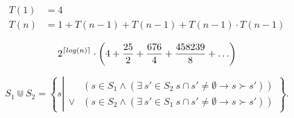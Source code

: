 \begin{frame}

\begin{align*}
T(1)&=4\\
T(n)&=1+T(n-1)+T(n-1)+T(n-1)\cdot T(n-1)
\end{align*}

$$2^{\lceil log(n)\rceil}\cdot\left(4+{25\over 2}+{676\over4}+{458239\over 8}+\ldots\right)$$

\end{frame}

\begin{frame}

$$S_1\Cup S_2 = \left\{ s \left|
\begin{array}{ll} &\left(s\in S_1 \wedge \left(\exists\ s'\in S_2\ s\cap
s'\neq\emptyset \longrightarrow s\succ s' \right) \right)\\ \vee & \left( s\in
S_2 \wedge \left(\exists\ s'\in S_1\ s\cap s'\neq\emptyset \longrightarrow
s\succ s' \right) \right) \end{array} \right.\right\}.$$

\end{frame}
